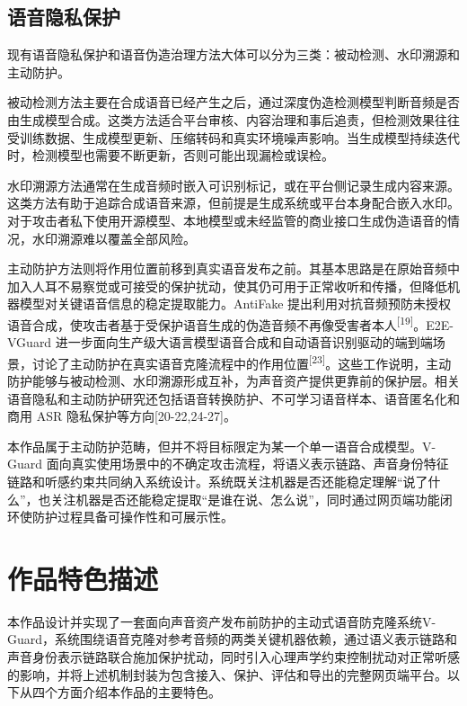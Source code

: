 \subsection{语音隐私保护}\label{ux8bedux97f3ux9690ux79c1ux4fddux62a4}

现有语音隐私保护和语音伪造治理方法大体可以分为三类：被动检测、水印溯源和主动防护。

被动检测方法主要在合成语音已经产生之后，通过深度伪造检测模型判断音频是否由生成模型合成。这类方法适合平台审核、内容治理和事后追责，但检测效果往往受训练数据、生成模型更新、压缩转码和真实环境噪声影响。当生成模型持续迭代时，检测模型也需要不断更新，否则可能出现漏检或误检。

水印溯源方法通常在生成音频时嵌入可识别标记，或在平台侧记录生成内容来源。这类方法有助于追踪合成语音来源，但前提是生成系统或平台本身配合嵌入水印。对于攻击者私下使用开源模型、本地模型或未经监管的商业接口生成伪造语音的情况，水印溯源难以覆盖全部风险。

主动防护方法则将作用位置前移到真实语音发布之前。其基本思路是在原始音频中加入人耳不易察觉或可接受的保护扰动，使其仍可用于正常收听和传播，但降低机器模型对关键语音信息的稳定提取能力。AntiFake
提出利用对抗音频预防未授权语音合成，使攻击者基于受保护语音生成的伪造音频不再像受害者本人\textsuperscript{{[}19{]}}。E2E-VGuard
进一步面向生产级大语言模型语音合成和自动语音识别驱动的端到端场景，讨论了主动防护在真实语音克隆流程中的作用位置\textsuperscript{{[}23{]}}。这些工作说明，主动防护能够与被动检测、水印溯源形成互补，为声音资产提供更靠前的保护层。相关语音隐私和主动防护研究还包括语音转换防护、不可学习语音样本、语音匿名化和商用
ASR 隐私保护等方向{[}20-22,24-27{]}。

本作品属于主动防护范畴，但并不将目标限定为某一个单一语音合成模型。V-Guard
面向真实使用场景中的不确定攻击流程，将语义表示链路、声音身份特征链路和听感约束共同纳入系统设计。系统既关注机器是否还能稳定理解``说了什么''，也关注机器是否还能稳定提取``是谁在说、怎么说''，同时通过网页端功能闭环使防护过程具备可操作性和可展示性。

\section{作品特色描述}\label{ux4f5cux54c1ux7279ux8272ux63cfux8ff0}

本作品设计并实现了一套面向声音资产发布前防护的主动式语音防克隆系统V-Guard，系统围绕语音克隆对参考音频的两类关键机器依赖，通过语义表示链路和声音身份表示链路联合施加保护扰动，同时引入心理声学约束控制扰动对正常听感的影响，并将上述机制封装为包含接入、保护、评估和导出的完整网页端平台。以下从四个方面介绍本作品的主要特色。

